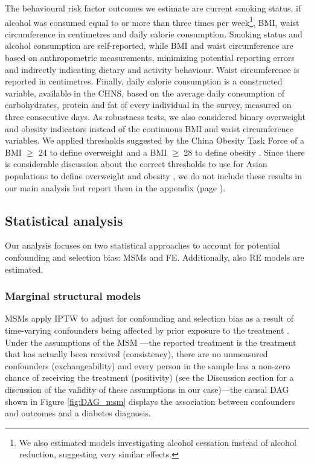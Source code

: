 The behavioural risk factor outcomes we estimate are current smoking status, if alcohol was consumed equal to or more than three times per week\footnote{We also estimated models investigating alcohol cessation instead of alcohol reduction, suggesting very similar effects.}, \ac{BMI}, waist circumference in centimetres and daily calorie consumption. Smoking status and alcohol consumption are self-reported, while \ac{BMI} and waist circumference are based on anthropometric measurements, minimizing potential reporting errors and indirectly indicating dietary and activity behaviour. Waist circumference is reported in centimetres. Finally, daily calorie consumption is a constructed variable, available in the \ac{CHNS}, based on the average daily consumption of carbohydrates, protein and fat of every individual in the survey, measured on three consecutive days. As robustness tests, we also considered binary overweight and obesity indicators instead of the continuous \ac{BMI} and waist circumference variables. We applied thresholds suggested by the China Obesity Task Force of a \ac{BMI} $\geq$ 24 to define overweight and a \ac{BMI} $\geq$ 28 to define obesity \parencite{group2004body}. Since there is considerable discussion about the correct thresholds to use for Asian populations to define overweight and obesity \parencite{WHO2004,He2015,Zeng2014a}, we do not include these results in our main analysis but report them in the appendix (page \pageref{tab:obesity_binary}). 


\subsection{Statistical analysis}


Our analysis focuses on two statistical approaches to account for potential confounding and selection bias: \acfp{MSM} and \acf{FE}. Additionally, also \ac{RE} models are estimated.

\subsubsection{Marginal structural models}

\acp{MSM} apply \ac{IPTW} to adjust for confounding and selection bias as a result of time-varying confounders being affected by prior exposure to the treatment \parencite{Robins2000}. Under the assumptions of the \ac{MSM}  \parencite{Robins2000}---the reported treatment is the treatment that has actually been received (consistency), there are no unmeasured confounders (exchangeability) and every person in the sample has a non-zero chance of receiving the treatment (positivity) (see the Discussion section for a discussion of the validity of these assumptions in our case)---the causal \ac{DAG} shown in Figure \ref{fig:DAG_msm} displays the association between confounders and outcomes and a diabetes diagnosis.

